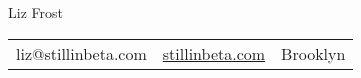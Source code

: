\centering
\textmd{\Huge Liz Frost} \\
\begin{tabular}{c | c | c}
liz@stillinbeta.com &
\href{https://stillinbeta.com}{stillinbeta.com} &
Brooklyn
\end{tabular}

\raggedright
